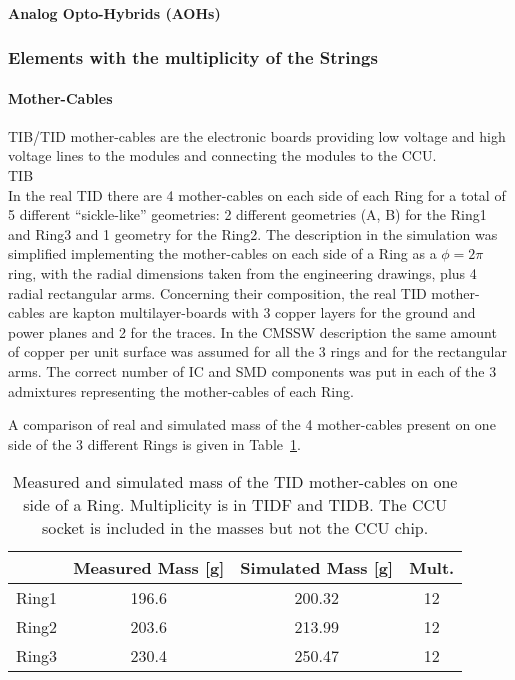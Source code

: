 \documentclass{cmspaper}
\begin{document}
\paragraph{Analog Opto-Hybrids (AOHs)}

\subsubsection{Elements with the multiplicity of the Strings}
\paragraph{Mother-Cables} 
TIB/TID mother-cables are the electronic boards providing low voltage
and high voltage lines to the modules and connecting the modules to the CCU.\\

\fixme TIB\\

In the real TID there are 4 mother-cables on each side of each Ring for a
total of 5 different ``sickle-like'' geometries: 2 different
geometries (A, B) for the Ring1 and
Ring3 and 1 geometry for the Ring2. The description in the simulation
was simplified implementing the mother-cables on each side of a Ring
as a $\phi=2\pi$ ring, with the radial dimensions taken from the
engineering drawings, plus 4 radial rectangular arms. 
Concerning their composition, the real TID mother-cables are kapton
multilayer-boards with 3 copper layers for the ground and power planes and 2 for
the traces. In the CMSSW description the same amount of copper per
unit surface was assumed for all the 3 rings and for the rectangular arms.
The correct number of IC and SMD components was put in each of the 3 admixtures
representing the mother-cables of each Ring.

A comparison of real and simulated mass of the 4 mother-cables present
on one side of the 3 different Rings is given in Table~\ref{tab:tid_mc}.
\begin{table}[h!]
  \caption{Measured and simulated mass of the TID mother-cables on one
  side of a Ring.  Multiplicity is in TIDF and TIDB. The CCU socket is
  included in the masses but not the CCU chip.}
  \label{tab:tid_mc}
  \begin{center}
    \begin{tabular}{lccc}
      & Measured Mass [g] & Simulated Mass [g] & Mult. \\
      \hline
      Ring1 & 196.6 & 200.32 & 12 \\
      Ring2 & 203.6 & 213.99 & 12 \\
      Ring3 & 230.4 & 250.47 & 12 \\
      \hline
    \end{tabular}
  \end{center}
\end{table}
\end{document}
